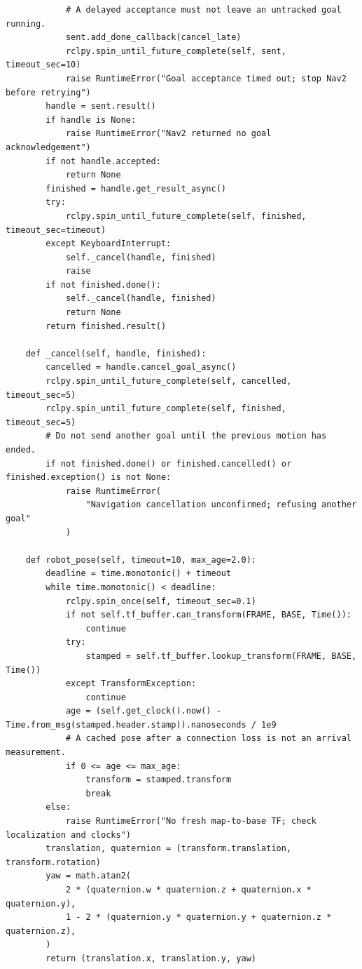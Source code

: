 \documentclass[11pt,a4paper]{book}
\begin{document}
\begin{lstlisting}
            # A delayed acceptance must not leave an untracked goal running.
            sent.add_done_callback(cancel_late)
            rclpy.spin_until_future_complete(self, sent, timeout_sec=10)
            raise RuntimeError("Goal acceptance timed out; stop Nav2 before retrying")
        handle = sent.result()
        if handle is None:
            raise RuntimeError("Nav2 returned no goal acknowledgement")
        if not handle.accepted:
            return None
        finished = handle.get_result_async()
        try:
            rclpy.spin_until_future_complete(self, finished, timeout_sec=timeout)
        except KeyboardInterrupt:
            self._cancel(handle, finished)
            raise
        if not finished.done():
            self._cancel(handle, finished)
            return None
        return finished.result()

    def _cancel(self, handle, finished):
        cancelled = handle.cancel_goal_async()
        rclpy.spin_until_future_complete(self, cancelled, timeout_sec=5)
        rclpy.spin_until_future_complete(self, finished, timeout_sec=5)
        # Do not send another goal until the previous motion has ended.
        if not finished.done() or finished.cancelled() or finished.exception() is not None:
            raise RuntimeError(
                "Navigation cancellation unconfirmed; refusing another goal"
            )

    def robot_pose(self, timeout=10, max_age=2.0):
        deadline = time.monotonic() + timeout
        while time.monotonic() < deadline:
            rclpy.spin_once(self, timeout_sec=0.1)
            if not self.tf_buffer.can_transform(FRAME, BASE, Time()):
                continue
            try:
                stamped = self.tf_buffer.lookup_transform(FRAME, BASE, Time())
            except TransformException:
                continue
            age = (self.get_clock().now() - Time.from_msg(stamped.header.stamp)).nanoseconds / 1e9
            # A cached pose after a connection loss is not an arrival measurement.
            if 0 <= age <= max_age:
                transform = stamped.transform
                break
        else:
            raise RuntimeError("No fresh map-to-base TF; check localization and clocks")
        translation, quaternion = (transform.translation, transform.rotation)
        yaw = math.atan2(
            2 * (quaternion.w * quaternion.z + quaternion.x * quaternion.y),
            1 - 2 * (quaternion.y * quaternion.y + quaternion.z * quaternion.z),
        )
        return (translation.x, translation.y, yaw)


\end{lstlisting}
\end{document}
